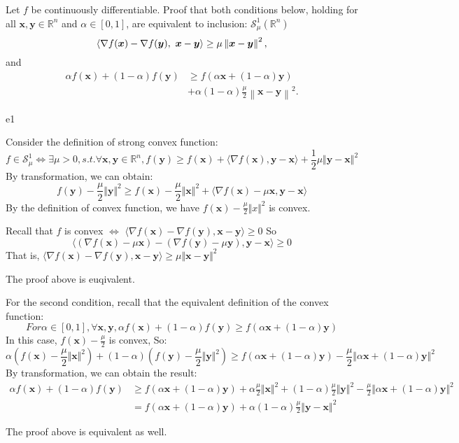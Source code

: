 \documentclass{article}
\newcommand{\xB}{\bm{x}}
\newcommand{\yB}{\bm{y}}
\newcommand{\RBB}{\mathbb{R}}
\newcommand{\SM}{\mathcal{S}}
\newcommand{\normgen}[1]{\left\| #1 \right\|}
\newcommand{\strongconvextype}[2]{\SM_{#1}^{#2}(\RBB^n)}
\begin{document}
\begin{excercise}\label{e1}
 Let $f$ be continuously differentiable. Proof that both conditions below, holding for all $\xB, \yB \in \RBB^n$  and $\alpha \in [0,1]$, are equivalent to inclusion: $\strongconvextype{\mu}{1}$
\begin{equation}\label{eq:2:1:17}
	\innerproduct{\nabla f(\xB) - \nabla f(\yB)}{\xB - \yB} \geq \mu \normgen{\xB - \yB}^2,
\end{equation}
and
\begin{align}
	\alpha f(\xB) + (1-\alpha) f(\yB) &\geq f(\alpha \xB + (1-\alpha) \yB )\nonumber\\
	&+ \alpha (1-\alpha) \frac{\mu}{2} \normgen{\xB - \yB}^2.\label{eq:2:1:18}
\end{align}
\end{excercise}
\begin{PROOF}{e1}

Consider the definition of strong convex function:
\begin{equation}
	f\in \mathcal{S}_{\mu}^{1} \iff \exists \mu >0 ,s.t. \forall \xB,\yB\in \mathbb{R}^n, f(\yB)\ge f(\xB)+\langle\nabla f(\xB),\yB-\xB\rangle+\frac{1}{2}\mu \Vert \yB-\xB\Vert^2
\end{equation}
By transformation, we can obtain:
\begin{equation}
	f(\yB)-\frac{\mu}{2}\Vert\yB\Vert^2\ge f(\xB)-\frac{\mu}{2}\Vert \xB\Vert^2+\langle\nabla f(\xB)-\mu\xB,\yB-\xB\rangle
\end{equation}
By the definition of convex function, we have $f(\xB)-\frac{\mu}{2}\Vert x\Vert^2$ is convex.

Recall that $f$ is convex $\iff$ $\langle\nabla f(\xB)-\nabla f(\yB),\xB-\yB\rangle\ge 0$
So 
\begin{equation}
	\langle(\nabla f(\xB)-\mu \xB)-(\nabla f(\yB)-\mu \yB),\yB-\xB\rangle\ge 0
\end{equation}
That is, $\langle\nabla f(\xB)-\nabla f(\yB),\xB-\yB\rangle\ge \mu\Vert \xB-\yB\Vert^2$

The proof above is euqivalent.

For the second condition, recall that the equivalent definition of the convex function:
\begin{equation}
	For \alpha\in [0,1],\forall \xB,\yB,\alpha f(\xB)+(1-\alpha)f(\yB)\ge f(\alpha\xB+(1-\alpha)\yB)
\end{equation}
In this case, $f(\xB)-\frac{\mu}{2}$ is convex, So:
\begin{equation}
	\alpha(f(\xB)-\frac{\mu}{2}\Vert \xB\Vert^2)+(1-\alpha)(f(\yB)-\frac{\mu}{2}\Vert\yB\Vert^2)\ge f(\alpha\xB+(1-\alpha)\yB)-\frac{\mu}{2}\Vert\alpha\xB+(1-\alpha)\yB\Vert^2
\end{equation}
By transformation, we can obtain the result:
\begin{align}
	\alpha f(\xB)+(1-\alpha)f(\yB)&\ge f(\alpha\xB+(1-\alpha)\yB)+\alpha\frac{\mu}{2}\Vert\xB\Vert^2+(1-\alpha)\frac{\mu}{2}\Vert\yB\Vert^2-\frac{\mu}{2}\Vert\alpha\xB+(1-\alpha)\yB\Vert^2\\
	&=f(\alpha\xB+(1-\alpha)\yB)+\alpha(1-\alpha)\frac{\mu}{2}\Vert\yB-\xB\Vert^2
\end{align}

The proof above is equivalent as well.

\end{PROOF}
\end{document}

